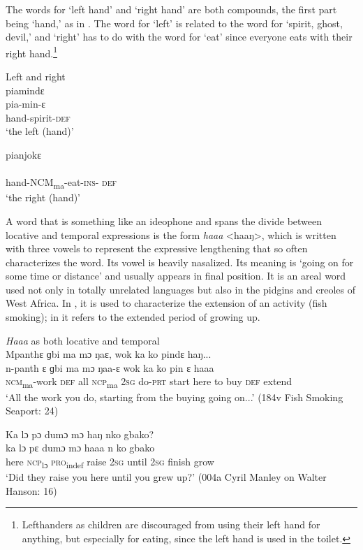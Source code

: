 The words for ‘left hand' and ‘right hand' are both compounds, the first part being ‘hand,' as in . The word for ‘left' is related to the word for ‘spirit, ghost, devil,' and ‘right' has to do with the word for ‘eat' since everyone eats with their right hand.\footnote{Lefthanders as children are discouraged from using their left hand for anything, but especially for eating, since the left hand is used in the toilet.}

\ea%
    \label{ex:99} Left and right\\
  \ea \label{ex:99a} piamindɛ\\
  \gll pia{}-min{}-ɛ\\
  hand-spirit-\textsc{def}\\
  \glt ‘the left (hand)'

\ex \label{ex:99b} pianjokɛ\\
  \\
  {hand}{-\textsc{NCM}}{\textsubscript{ma}}{-eat}{-\textsc{ins}}- \textsc{def}\\
  \glt ‘the right (hand)'
\z
\z

A word that is something like an ideophone and spans the divide between locative and temporal expressions is the form \textit{haaa} <haaŋ>, which is written with three vowels to represent the expressive lengthening that so often characterizes the word. Its vowel is heavily nasalized. Its meaning is ‘going on for some time or distance' and usually appears in final position. It is an areal word used not only in totally unrelated languages but also in the pidgins and creoles of West Africa. In , it is used to characterize the extension of an activity (fish smoking); in  it refers to the extended period of growing up.


\ea%
  \label{ex:100}
  \textit{Haaa} as both locative and temporal\\
  \ea \label{ex:100a}  Mpanthɛ ɡbi ma mɔ ŋaɛ, wok ka ko pindɛ haŋ...\\
  \gll n-panth      ɛ    ɡbi  ma    mɔ  ŋaa-ɛ    wok  ka    ko    pin  ɛ    haaa\\
  \textsc{ncm}\textsubscript{ma}{}-work  \textsc{def}  all    \textsc{ncp}\textsubscript{ma}    \textsc{2sg}  do-\textsc{prt}  start  here  to    buy  \textsc{def}  extend\\
  \glt ‘All the work you do, starting from the buying going on...' (184v Fish Smoking Seaport: 24)

\ex \label{ex:100b} Ka lɔ pɔ dumɔ mɔ haŋ nko gbako?\\
  \gll ka    lɔ    pɛ      dumɔ    mɔ  haaa  n    ko      gbako\\
  here  \textsc{ncp}\textsubscript{lɔ}  \textsc{pro}\textsubscript{indef}  raise    \textsc{2sg}  until  \textsc{2sg}  finish    grow\\
  \glt ‘Did they raise you here until you grew up?' (004a Cyril Manley on Walter Hanson: 16)
  \z
  \z

